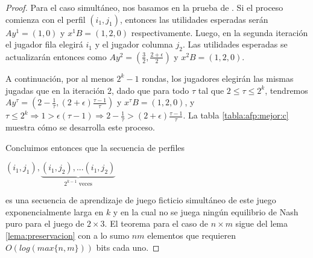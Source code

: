 \begin{proof}
    Para el caso simultáneo, nos basamos en la prueba de \cite{brandt:rate:convergence}. Si el proceso comienza con el perfil $(i_1, j_1)$, entonces las utilidades esperadas serán $Ay^1 = (1, 0)$ y $x^1 B = (1, 2, 0)$ respectivamente. Luego, en la segunda iteración el jugador fila elegirá $i_1$ y el jugador columna $j_2$. Las utilidades esperadas se actualizarán entonces como $Ay^2 = (\frac{3}{2}, \frac{2 + \epsilon}{2})$ y $x^2 B = (1, 2, 0)$.

    A continuación, por al menos $2^{k}-1$ rondas, los jugadores elegirán las mismas jugadas que en la iteración 2, dado que para todo $\tau$ tal que $2 \le \tau \le 2^k$, tendremos $Ay^\tau = (2 - \frac{1}{\tau}, (2 + \epsilon)\frac{\tau-1}{\tau})$ y $x^\tau B = (1, 2, 0)$, y $\tau \le 2^k \Rightarrow 1 > \epsilon (\tau-1) \Rightarrow 2 - \frac{1}{\tau} > (2 + \epsilon)\frac{\tau-1}{\tau}$. La tabla \ref{tabla:afp:mejor:c} muestra cómo se desarrolla este proceso.

    Concluimos entonces que la secuencia de perfiles

    \begin{center}
    \begin{math}
        (i_1, j_1), \underbrace{(i_1, j_2), ... (i_1, j_2)}_{\text{$2^{k-1}$ veces}}
    \end{math}
    \end{center}


    es una secuencia de aprendizaje de juego ficticio simultáneo de este juego exponencialmente larga en $k$ y en la cual no se juega ningún equilibrio de Nash puro para el juego de $2 \times 3$. El teorema para el caso de $n \times m$ sigue del lema \ref{lema:preservacion} con a lo sumo $nm$ elementos que requieren $O(log(max\{n,m\}))$ bits cada uno.

\end{proof}